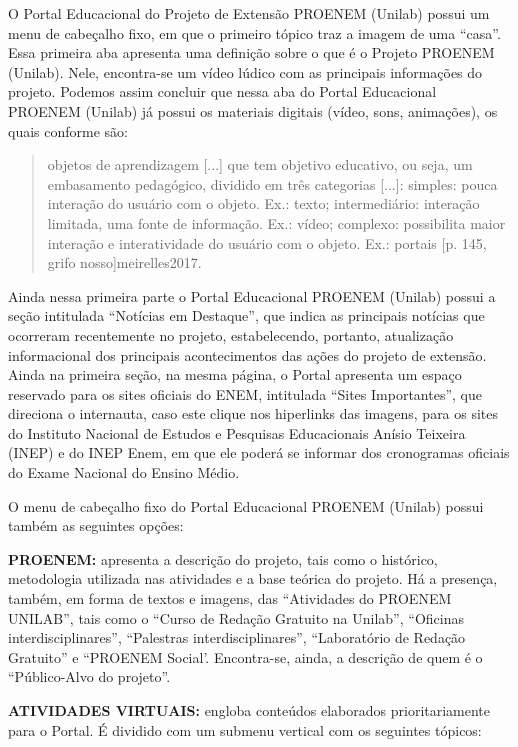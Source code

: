 \documentclass{textolivre}
\newcounter{quote}
\begin{document}
O Portal Educacional do Projeto de Extensão PROENEM (Unilab) possui um menu de cabeçalho fixo, em que o primeiro tópico traz a imagem de uma “casa”. Essa primeira aba apresenta uma definição sobre o que é o Projeto PROENEM (Unilab). Nele, encontra-se um vídeo lúdico com as principais informações do projeto. Podemos assim concluir que nessa aba do Portal Educacional PROENEM (Unilab) já possui os materiais digitais (vídeo, sons, animações), os quais conforme \textcite{machado2013} são:

\begin{quote}
objetos de aprendizagem [...] que tem objetivo educativo, ou seja, um embasamento pedagógico, dividido em três categorias [...]: simples: pouca interação do usuário com o objeto. Ex.: texto; intermediário: interação limitada, uma fonte de informação. Ex.: vídeo; complexo: possibilita maior interação e interatividade do usuário com o objeto. Ex.: portais [p. 145, grifo nosso]{meirelles2017}.
\end{quote}

Ainda nessa primeira parte o Portal Educacional PROENEM (Unilab) possui a seção intitulada “Notícias em Destaque”, que indica as principais notícias que ocorreram recentemente no projeto, estabelecendo, portanto, atualização informacional dos principais acontecimentos das ações do projeto de extensão. Ainda na primeira seção, na mesma página, o Portal apresenta um espaço reservado para os sites oficiais do ENEM, intitulada “Sites Importantes”, que direciona o internauta, caso este clique nos hiperlinks das imagens, para os sites do Instituto Nacional de Estudos e Pesquisas Educacionais Anísio Teixeira (INEP) e do INEP Enem, em que ele poderá se informar dos cronogramas oficiais do Exame Nacional do Ensino Médio.

O menu de cabeçalho fixo do Portal Educacional PROENEM (Unilab) possui também as seguintes opções: 

\textbf{PROENEM:} apresenta a descrição do projeto, tais como o histórico, metodologia utilizada nas atividades e a base teórica do projeto. Há a presença, também, em forma de textos e imagens, das “Atividades do PROENEM UNILAB”, tais como o “Curso de Redação Gratuito na Unilab”, “Oficinas interdisciplinares”, “Palestras interdisciplinares”, “Laboratório de Redação Gratuito” e “PROENEM Social’. Encontra-se, ainda, a descrição de quem é o “Público-Alvo do projeto”.

\textbf{ATIVIDADES VIRTUAIS:} engloba conteúdos elaborados prioritariamente para o Portal. É dividido com um submenu vertical com os seguintes tópicos:
\end{document}
